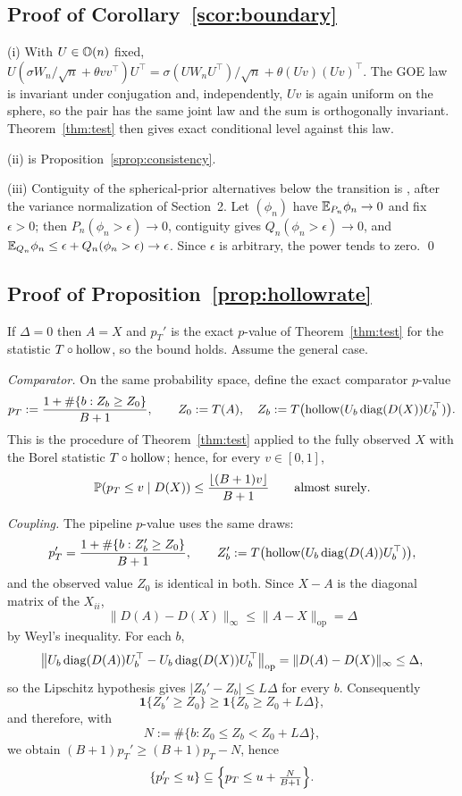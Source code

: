 \subsection{Proof of Corollary~\ref{scor:boundary}}

(i) With $U\in\mathbb{O}(n)$ fixed,
$U(\sigma W_n/\sqrt n+\theta vv^\top)U^\top
=\sigma(UW_nU^\top)/\sqrt n+\theta(Uv)(Uv)^\top$. The GOE law is
invariant under conjugation and, independently, $Uv$ is again uniform
on the sphere, so the pair has the same joint law and the sum is
orthogonally invariant. Theorem~\ref{thm:test} then gives exact
conditional level against this law.

(ii) is Proposition~\ref{sprop:consistency}.

(iii) Contiguity of the spherical-prior alternatives below the
transition is \citet{perry2018optimality}, after the variance
normalization of Section~2. Let $(\phi_n)$ have
$\mathbb{E}_{P_n}\phi_n\to0$ and fix $\epsilon>0$; then
$P_n(\phi_n>\epsilon)\to0$, contiguity gives
$Q_n(\phi_n>\epsilon)\to0$, and
$\mathbb{E}_{Q_n}\phi_n\le\epsilon+Q_n(\phi_n>\epsilon)\to\epsilon$. Since
$\epsilon$ is arbitrary, the power tends to zero. \qed

\subsection{Proof of Proposition~\ref{prop:hollowrate}}

If $\Delta=0$ then $A=X$ and $p_T'$ is the exact $p$-value of
Theorem~\ref{thm:test} for the statistic $T\circ\operatorname{hollow}$, so the
bound holds. Assume the general case.

\emph{Comparator.} On the same probability space, define the exact
comparator $p$-value
\[
p_T
:=
\frac{1+\#\{b:Z_b\ge Z_0\}}{B+1},
\qquad
Z_0:=T(A),
\quad
Z_b:=T\bigl(\operatorname{hollow}(U_b\operatorname{diag}(D(X))U_b^\top)\bigr).
\]
This is the procedure of Theorem~\ref{thm:test} applied to the fully
observed $X$ with the Borel statistic $T\circ\operatorname{hollow}$; hence, for
every $v\in[0,1]$,
\[
\mathbb{P}(p_T\le v\mid D(X))\le\frac{\lfloor(B+1)v\rfloor}{B+1}
\qquad\text{almost surely}.
\]

\emph{Coupling.} The pipeline $p$-value uses the same draws:
\[
p_T'
=
\frac{1+\#\{b:Z_b'\ge Z_0\}}{B+1},
\qquad
Z_b':=T\bigl(\operatorname{hollow}(U_b\operatorname{diag}(D(A))U_b^\top)\bigr),
\]
and the observed value $Z_0$ is identical in both. Since $X-A$ is the
diagonal matrix of the $X_{ii}$,
\[
\lVert D(A)-D(X)\rVert_\infty
\le
\lVert A-X\rVert_{\mathrm{op}}
=
\Delta
\]
by Weyl's inequality. For each $b$,
\[
\bigl\lVert
U_b\operatorname{diag}(D(A))U_b^\top-U_b\operatorname{diag}(D(X))U_b^\top
\bigr\rVert_{\mathrm{op}}
=
\lVert D(A)-D(X)\rVert_\infty
\le\Delta,
\]
so the Lipschitz hypothesis gives $|Z_b'-Z_b|\le L\Delta$ for every
$b$. Consequently
\[
\mathbf 1\{Z_b'\ge Z_0\}
\ge
\mathbf 1\{Z_b\ge Z_0+L\Delta\},
\]
and therefore, with
\[
N:=\#\bigl\{b:Z_0\le Z_b<Z_0+L\Delta\bigr\},
\]
we obtain $(B+1)p_T'\ge(B+1)p_T-N$, hence
\[
\{p_T'\le u\}
\subseteq
\Bigl\{p_T\le u+\tfrac{N}{B+1}\Bigr\}.
\]


